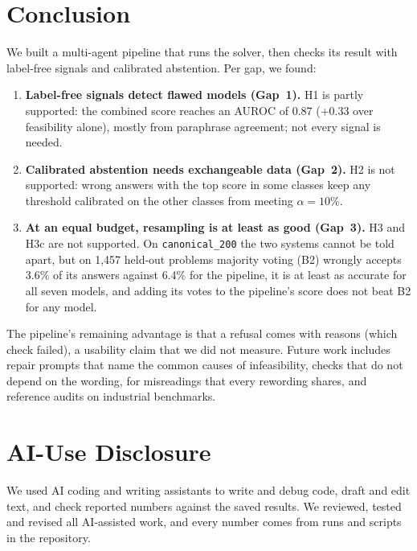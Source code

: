 \documentclass[conference]{IEEEtran}
\begin{document}
\section{Conclusion}
\label{sec:conclusion}
We built a multi-agent pipeline that runs the solver, then checks its result with label-free signals and
calibrated abstention. Per gap, we found:
\begin{enumerate}
\item \textbf{Label-free signals detect flawed models (Gap~1).} H1 is partly supported: the combined score reaches
an AUROC of 0.87 (+0.33 over feasibility alone), mostly from paraphrase agreement; not every signal is needed.
\item \textbf{Calibrated abstention needs exchangeable data (Gap~2).} H2 is not supported: wrong answers with the top
score in some classes keep any threshold calibrated on the other classes from meeting $\alpha = 10\%$.
\item \textbf{At an equal budget, resampling is at least as good (Gap~3).} H3 and H3c are not supported. On
\texttt{canonical\_200} the two systems cannot be told apart, but on 1,457 held-out problems majority voting (B2)
wrongly accepts 3.6\% of its answers against 6.4\% for the pipeline, it is at least as accurate for all seven models,
and adding its votes to the pipeline's score does not beat B2 for any model.
\end{enumerate}
The pipeline's remaining advantage is that a refusal comes with reasons (which check failed), a usability claim that
we did not measure. Future work includes repair prompts that name the common causes of infeasibility, checks that do not
depend on the wording, for misreadings that every rewording shares, and reference audits on industrial benchmarks.


\section*{AI-Use Disclosure}
We used AI coding and writing assistants to write and debug code, draft and edit text, and check reported numbers
against the saved results. We reviewed, tested and revised all AI-assisted work, and every number comes from runs and
scripts in the repository.



\end{document}
